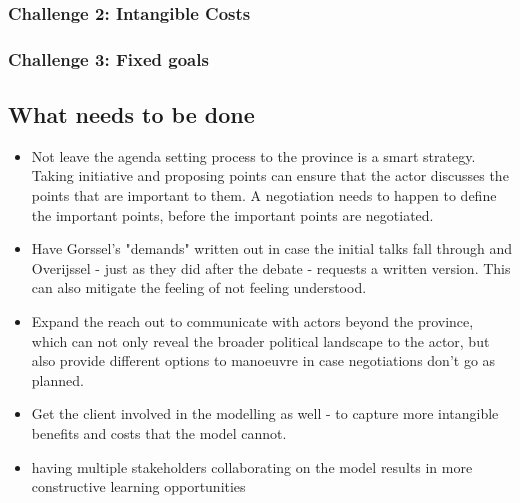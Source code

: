 \subsubsection{Challenge 2: Intangible Costs}

\subsubsection{Challenge 3: Fixed goals}


\subsection{What needs to be done}

\begin{itemize}
    \item Not leave the agenda setting process to the province is a smart strategy. Taking initiative and proposing points can ensure that the actor discusses the points that are important to them. A negotiation needs to happen to define the important points, before the important points are negotiated.
    \item Have Gorssel's "demands" written out in case the initial talks fall through and Overijssel - just as they did after the debate - requests a written version. This can also mitigate the feeling of not feeling understood.  
    \item Expand the reach out to communicate with actors beyond the province, which can not only reveal the broader political landscape to the actor, but also provide different options to manoeuvre in case negotiations don't go as planned.
    \item Get the client involved in the modelling as well - to capture more intangible benefits and costs that the model cannot.
    \item having multiple stakeholders collaborating on the model results in more constructive learning opportunities
\end{itemize}

